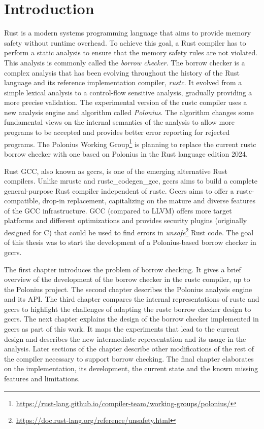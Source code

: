\documentclass[
  11pt,
  twoside,symmetric]{report}
\DeclareRobustCommand{\href}[2]{#2\footnote{\url{#1}}}
\begin{document}
\chapter{Introduction}\label{introduction}

Rust is a modern systems programming language that aims to provide
memory safety without runtime
overhead. To achieve this goal, a
Rust compiler has to perform a static analysis to ensure that the memory
safety rules are not violated. This analysis is commonly called the
\emph{borrow checker}. The borrow checker is a complex analysis that has
been evolving throughout the history of the Rust language and its
reference implementation compiler, \emph{rustc}. It evolved from a
simple lexical analysis to a control-flow sensitive analysis, gradually
providing a more precise validation. The experimental version of the
rustc compiler uses a new analysis engine and algorithm called
\emph{Polonius}. The algorithm changes some fundamental views on the
internal semantics of the analysis to allow more programs to be accepted
and provides better error reporting for rejected
programs. The
\href{https://rust-lang.github.io/compiler-team/working-groups/polonius/}{Polonius
Working Group} is planning to replace the current rustc borrow checker
with one based on Polonius in the Rust language edition
2024.

Rust GCC, also known as gccrs, is one of the emerging alternative Rust
compilers. Unlike mrustc and rustc\_codegen\_gcc, gccrs aims to build a
complete general-purpose Rust compiler independent of rustc. Gccrs aims
to offer a rustc-compatible, drop-in replacement, capitalizing on the
mature and diverse features of the GCC infrastructure. GCC (compared to
LLVM) offers more target platforms and different optimizations and
provides security plugins (originally designed for C) that could be used
to find errors in
\href{https://doc.rust-lang.org/reference/unsafety.html}{\emph{unsafe}}
Rust code. The goal of this thesis was
to start the development of a Polonius-based borrow checker in gccrs.

The first chapter introduces the problem of borrow checking. It gives a
brief overview of the development of the borrow checker in the rustc
compiler, up to the Polonius project. The second chapter describes the
Polonius analysis engine and its API. The third chapter compares the
internal representations of rustc and gccrs to highlight the challenges
of adapting the rustc borrow checker design to gccrs. The next chapter
explains the design of the borrow checker implemented in gccrs as part
of this work. It maps the experiments that lead to the current design
and describes the new intermediate representation and its usage in the
analysis. Later sections of the chapter describe other modifications of
the rest of the compiler necessary to support borrow checking. The final
chapter elaborates on the implementation, its development, the current
state and the known missing features and limitations.
\end{document}
